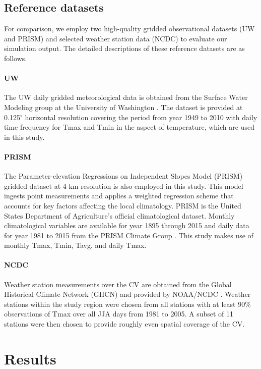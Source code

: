 \documentclass[draft,ms]{agutex}   %
\begin{document}
\begin{article}
\subsection{Reference datasets}

For comparison, we employ two high-quality gridded observational datasets (UW and PRISM) and selected weather station data (NCDC) to evaluate our simulation output. The detailed descriptions of these reference datasets are as follows.

\paragraph{UW} The UW daily gridded meteorological data is obtained from the Surface Water Modeling group at the University of Washington \citep{maurer2002long, hamlet2005production}. The dataset is provided at 0.125$^\circ$ horizontal resolution covering the period from year 1949 to 2010 with daily time frequency for Tmax and Tmin in the aspect of temperature, which are used in this study.

\paragraph{PRISM} The Parameter-elevation Regressions on Independent Slopes Model (PRISM) \citep{daly2008physiographically} gridded dataset at 4 km resolution is also employed in this study.  This model ingests point measurements and applies a weighted regression scheme that accounts for key factors affecting the local climatology. PRISM is the United States Department of Agriculture's official climatological dataset. Monthly climatological variables are available for year 1895 through 2015 and daily data for year 1981 to 2015 from the PRISM Climate Group \citep{prismSource}. This study makes use of monthly Tmax, Tmin, Tavg, and daily Tmax.

\paragraph{NCDC} Weather station measurements over the CV are obtained from the Global Historical Climate Network (GHCN) and provided by NOAA/NCDC \citep{menne2012overview}. Weather stations within the study region were chosen from all stations with at least 90$\%$ observations of Tmax over all JJA days from 1981 to 2005.  A subset of 11 stations were then chosen to provide roughly even spatial coverage of the CV.

\section{Results}


\end{article}
\end{document}
